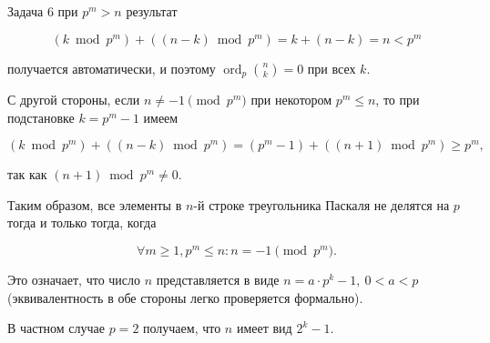\documentclass{article}
\DeclareMathOperator{\ord}{ord}
\begin{document}
\begin{section}{Задача 6}
		при $p^m > n$ результат

		\begin{equation*}
			(k \bmod p^m) + ((n-k) \bmod p^m) = k + (n - k) = n < p^m
		\end{equation*}

		получается автоматически, и поэтому $\ord_p \binom{n}{k} = 0$ при всех $k$.

		С другой стороны, если $n \ne -1 \pmod{p^m}$ при некотором $p^m \le n$, то при подстановке $k = p^m - 1$ имеем

		\begin{equation*}
			(k \bmod p^m) + ((n-k) \bmod p^m) = (p^m-1) + ((n+1) \bmod p^m) \ge p^m,
		\end{equation*}

		так как $(n+1) \bmod p^m \ne 0$.

		Таким образом, все элементы в $n$-й строке треугольника Паскаля не делятся на $p$ тогда и только тогда, когда

		\begin{equation*}
			\forall m \ge 1, p^m \le n: n = -1 \pmod{p^m}.
		\end{equation*}

		Это означает, что число $n$ представляется в виде $n = a \cdot p^k - 1, \ 0 < a < p$ (эквивалентность в обе стороны легко проверяется формально).

		В частном случае $p = 2$ получаем, что $n$ имеет вид $2^k - 1$.
	\end{section}
\end{document}
